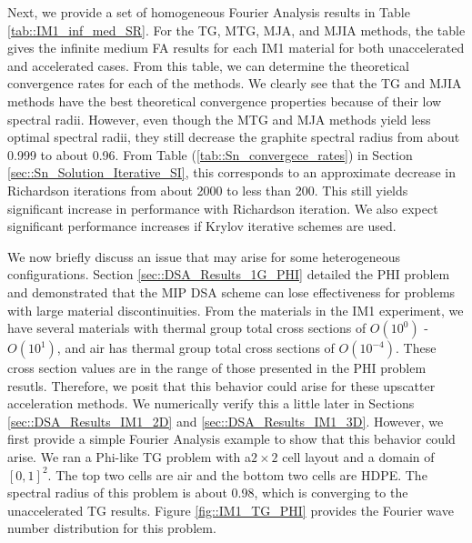 Next, we provide a set of homogeneous Fourier Analysis results in Table \ref{tab::IM1_inf_med_SR}. For the TG, MTG, MJA, and MJIA methods, the table gives the infinite medium FA results for each IM1 material for both unaccelerated and accelerated cases. From this table, we can determine the theoretical convergence rates for each of the methods. We clearly see that the TG and MJIA methods have the best theoretical convergence properties because of their low spectral radii. However, even though the MTG and MJA methods yield less optimal spectral radii, they still decrease the graphite spectral radius from about 0.999 to about 0.96. From Table (\ref{tab::Sn_convergece_rates}) in Section \ref{sec::Sn_Solution_Iterative_SI},  this corresponds to an approximate decrease in Richardson iterations from about 2000 to less than 200. This still yields significant increase in performance with Richardson iteration. We also expect significant performance increases if Krylov iterative schemes are used. 

We now briefly discuss an issue that may arise for some heterogeneous configurations. Section \ref{sec::DSA_Results_1G_PHI} detailed the PHI problem and demonstrated that the MIP DSA scheme can lose effectiveness for problems with large material discontinuities. From the materials in the IM1 experiment, we have several materials with thermal group total cross sections of $O(10^0)$ - $O(10^1)$, and air has thermal group total cross sections of $O(10^{-4})$. These cross section values are in the range of those presented in the PHI problem resutls. Therefore, we posit that this behavior could arise for these upscatter acceleration methods. We numerically verify this a little later in Sections \ref{sec::DSA_Results_IM1_2D} and \ref{sec::DSA_Results_IM1_3D}. However, we first provide a simple Fourier Analysis example to show that this behavior could arise. We ran a Phi-like TG problem with a$2 \times 2$ cell layout and a domain of $[0,1]^2$. The top two cells are air and the bottom two cells are HDPE. The spectral radius of this problem is about 0.98, which is converging to the unaccelerated TG results. Figure \ref{fig::IM1_TG_PHI} provides the Fourier wave number distribution for this problem.

